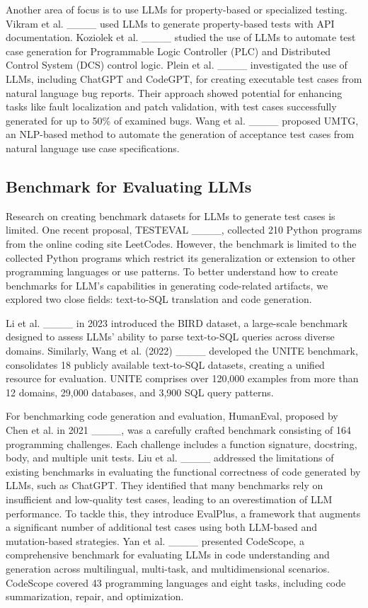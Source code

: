 Another area of focus is to use LLMs for property-based or specialized testing. Vikram et al. ____ used LLMs to generate property-based tests with API documentation. Koziolek et al. ____ studied the use of LLMs to automate test case generation for Programmable Logic Controller (PLC) and Distributed Control System (DCS) control logic. Plein et al. ____  investigated the use of LLMs, including ChatGPT and CodeGPT, for creating executable test cases from natural language bug reports. Their approach showed potential for enhancing tasks like fault localization and patch validation, with test cases successfully generated for up to 50\% of examined bugs. Wang et al. ____ proposed UMTG, an NLP-based method to automate the generation of acceptance test cases from natural language use case specifications.


\subsection{Benchmark for Evaluating LLMs}

Research on creating benchmark datasets for LLMs to generate test cases is limited. One recent proposal, TESTEVAL ____, collected 210 Python programs from the online coding site LeetCodes. However, the benchmark is limited to the collected Python programs which restrict its generalization or extension to other programming languages or use patterns. To better understand how to create benchmarks for LLM’s capabilities in generating code-related artifacts, we explored two close fields: text-to-SQL translation and code generation. 

Li et al. ____ in 2023 introduced the BIRD dataset, a large-scale benchmark designed to assess LLMs' ability to parse text-to-SQL queries across diverse domains. Similarly, Wang et al. (2022) ____ developed the UNITE benchmark, consolidates 18 publicly available text-to-SQL datasets, creating a unified resource for evaluation. UNITE comprises over 120,000 examples from more than 12 domains, 29,000 databases, and 3,900 SQL query patterns. 

For benchmarking code generation and evaluation, HumanEval, proposed by Chen et al. in 2021 ____, was a carefully crafted benchmark consisting of 164 programming challenges. Each challenge includes a function signature, docstring, body, and multiple unit tests. Liu et al. ____ addressed the limitations of existing benchmarks in evaluating the functional correctness of code generated by LLMs, such as ChatGPT. They identified that many benchmarks rely on insufficient and low-quality test cases, leading to an overestimation of LLM performance. To tackle this, they introduce EvalPlus, a framework that augments a significant number of additional test cases using both LLM-based and mutation-based strategies. Yan et al. ____ presented CodeScope, a comprehensive benchmark for evaluating LLMs in code understanding and generation across multilingual, multi-task, and multidimensional scenarios. CodeScope covered 43 programming languages and eight tasks, including code summarization, repair, and optimization.

